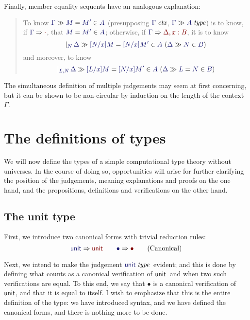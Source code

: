 \documentclass[main.tex]{subfiles}
\begin{document}
Finally, member equality sequents have an analogous explanation:

\begin{quote}
  To know $\sequent{\Gamma}{\ever{M}{M'}{A}}$ (presupposing $\isctx\Gamma$, $\sequent{\Gamma}{\isset{A}}$) is to know, if
  $\reduce{\Gamma}{\cdot}$, that $\ever{M}{M'}{A}$; otherwise, if
  $\reduce{\Gamma}{\Delta,x:B}$, it is to know
  \[
    \genj{N}{
      \hyp{
        \sequent{\Delta}{
          \ever{[N/x]M}{[N/x]M'}{A}
        }
      }{
        \sequent{\Delta}{
          \ver{N}{B}
        }
      }
    }
  \]
  and moreover, to know
  \[
    \genj{L,N}{
      \hyp{
        \sequent{\Delta}{
          \ever{[L/x]M}{[N/x]M'}{A}
        }
      }{
        \sequent{\Delta}{
          \ever{L}{N}{B}
        }
      }
    }
  \]
\end{quote}

The simultaneous definition of multiple judgements may seem at first
concerning, but it can be shown to be non-circular by induction on the length
of the context $\Gamma$.

\section{The definitions of types}

We will now define the types of a simple computational type theory without
universes. In the course of doing so, opportunities will arise for further
clarifying the position of the judgements, meaning explanations and proofs on
the one hand, and the propositions, definitions and verifications on the other
hand.

\subsection{The unit type}

First, we introduce two canonical forms with trivial reduction rules:
\begin{equation}
  \reduce\tyunit\tyunit\qquad
  \reduce\bullet\bullet
  \tag{Canonical}
\end{equation}

Next, we intend to make the judgement $\isset\tyunit$\ evident; and this is done by
defining what counts as a canonical verification of $\mathsf{unit}$\ and when two such
verifications are equal. To this end, we say that $\bullet$ is a canonical
verification of $\mathsf{unit}$, and that it is equal to itself.  I wish to emphasize
that this is the entire definition of the type: we have introduced syntax, and
we have defined the canonical forms, and there is nothing more to be done.
\end{document}
